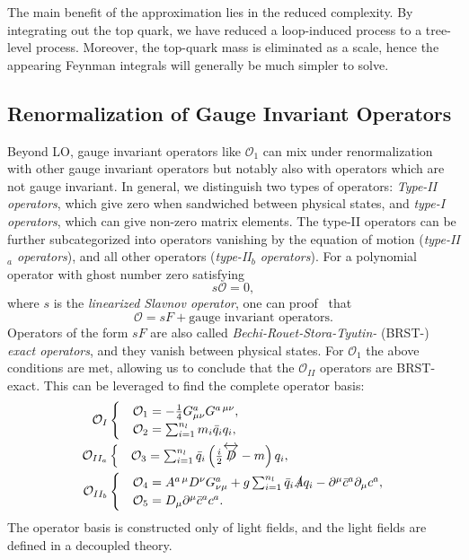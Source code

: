 The main benefit of the approximation lies in the reduced complexity. By integrating out the top quark, we have reduced a loop-induced process to a tree-level process. Moreover, the top-quark mass is eliminated as a scale, hence the appearing Feynman integrals will generally be much simpler to solve.

\subsection{Renormalization of Gauge Invariant Operators}
Beyond \acs{LO}, gauge invariant operators like $\mathcal{O}_1$ can mix under renormalization with other gauge invariant operators but notably also with operators which are not gauge invariant. In general, we distinguish two types of operators: \textit{Type-II operators}, which give zero when sandwiched between physical states, and \textit{type-I operators}, which can give non-zero matrix elements. The type-II operators can be further subcategorized into operators vanishing by the equation of motion (\textit{type-II${}_a$ operators}), and all other operators (\textit{type-II${}_b$ operators}). For a polynomial operator with ghost number zero satisfying
\begin{equation}
s \mathcal{O} = 0,
\end{equation}
where $s$ is the \textit{linearized Slavnov operator}, one can proof~\cite{Kluberg-Stern:1974iel, Joglekar:1975nu, Henneaux:2011rma} that
\begin{equation}
\mathcal{O} = s F + \text{gauge invariant operators}.
\end{equation}
Operators of the form $s F$ are also called \textit{Bechi-Rouet-Stora-Tyutin-} (BRST-) \textit{exact operators}, and they vanish between physical states. For $\mathcal{O}_1$ the above conditions are met, allowing us to conclude that the $\mathcal{O}_{II}$ operators are BRST-exact. This can be leveraged to find the complete operator basis:
\begin{equation}
\begin{split}
\mathcal{O}_{I} &\begin{cases} &\mathcal{O}_1 = -\frac{1}{4} G^a_{\mu \nu} G^{a\, \mu\nu}, \\
&\mathcal{O}_2 = \sum_{i=1}^{n_l} m_i \bar{q}_i q_i, \end{cases} \\
\mathcal{O}_{II_a} &\begin{cases} &\mathcal{O}_3 = \sum_{i=1}^{n_l} \bar{q}_i \left( \frac{i}{2} \overleftrightarrow{\slashed{D}} - m \right) q_i, \end{cases} \\
\mathcal{O}_{II_b} &\begin{cases} &\mathcal{O}_4 = A^{a\, \mu} D^\nu G_{\nu\mu}^a + g \sum_{i=1}^{n_l} \bar{q}_i \slashed{A} q_i - \partial^\mu \bar{c}^a \partial_\mu c^a, \\
&\mathcal{O}_5 = D_\mu \partial^\mu \bar{c}^a c^a. \end{cases}
\end{split}
\label{eq:4:operators}
\end{equation}
The operator basis is constructed only of light fields, and the light fields are defined in a decoupled theory.

